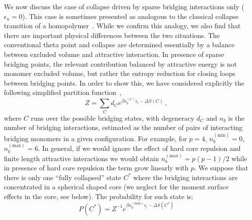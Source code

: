 \documentclass[
preprint,
a4paper,
12pt,
superscriptaddress,
pre]{revtex4}
\begin{document}
%

We now discuss the case of collapse driven by sparse bridging
interactions only ($\epsilon_u = 0$). This case is sometimes presented
as analogous to the classical collapse transition of a
homopolymer~\cite{Barbieri2013a}. While we confirm this analogy, we
also find that there are important physical differences between the
two situations. The conventional theta point and collapse are
determined essentially by a balance between excluded volume and
attractive interaction. In presence of sparse bridging points, the
relevant contribution balanced by attractive energy is not monomer
excluded volume, but rather the entropy reduction for closing loops
between bridging points. In order to show this, we have considered
explicitly the following simplified partition
function~\cite{Marenduzzo2006c,Saiz2006a},
\begin{equation}
  \label{eq:Zloop}
  Z = \sum_{C} d_C e^{\beta n_b^{(C)} \epsilon_l - \Delta S(C)} \ ,
\end{equation}
where $C$ runs over the possible bridging states, with degeneracy
$d_C$
and $n_b$ is the number of bridging interactions, estimated as the
number of pairs of interacting bridging monomers in a given
configuration. For example, for $p=4$, $n_b^{\mathrm{(min)}}=0$,
$n_b^{\mathrm{(max)}}=6$. In general, if we would ignore the effect of
hard core repulsion and finite length attractive interactions we would
obtain $n_b^{\mathrm{(max)}}=p(p-1)/2$ while in presence of hard core
repulsion the term grow linearly with $p$.
%
We suppose that there is only one ``fully collapsed'' state $C^*$
where the bridging interactions are concentrated in a spherical shaped
core (we neglect for the moment surface effects in the core, see
below). The probability for such state is:
\begin{equation}
  \label{eq:prob_collapseZ}
  P(C^*) = Z^{-1}  e^{\beta n_b^{\mathrm{(max)}} \epsilon_l - \Delta S(C^*)}
\end{equation}
\end{document}
